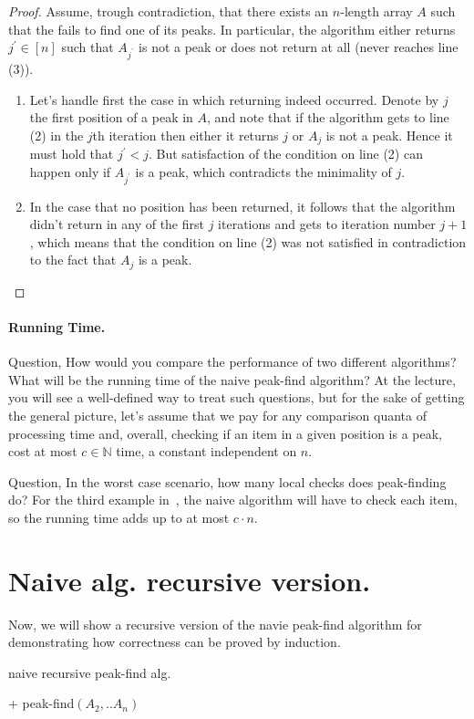 \begin{proof}
  Assume, trough contradiction, that there exists an $n$-length array $A$ such that the  fails to find one of its peaks. In particular, the algorithm either returns $j^{\prime} \in [n]$ such that $A_{j^{\prime}}$ is not a peak or does not return at all (never reaches line (3)).
\begin{enumerate}
  \item Let's handle first the case in which returning indeed occurred. Denote by $j$ the first position of a peak in $A$, and note that if the algorithm gets to line (2) in the $j$th iteration then either it returns $j$ or $A_{j}$ is not a peak.
  Hence it must hold that $j^{\prime} < j$. But satisfaction of the condition on line (2) can happen only if $A_{j^{\prime}}$ is a peak, which contradicts the minimality of $j$.
\item In the case that no position has been returned, it follows that the algorithm didn't return in any of the first $j$ iterations and gets to iteration number $j+1$, which means that the condition on line (2) was not satisfied in contradiction to the fact that $A_{j}$ is a peak.
\end{enumerate}
\end{proof}

\paragraph{Running Time.} 
Question, How would you compare the performance of two different algorithms? What will be the running time of the naive peak-find algorithm? At the lecture, you will see a well-defined way to treat such questions, but for the sake of getting the general picture, let's assume that we pay for any comparison quanta of processing time and, overall, checking if an item in a given position is a peak, cost at most $c\in \mathbb{N}$ time, a constant independent on $n$.

Question, In the worst case scenario, how many local checks does peak-finding do? For the third example in~, the naive algorithm will have to check each item, so the running time adds up to at most $c \cdot n$.

\section{Naive alg. recursive version.}
Now, we will show a recursive version of the navie peak-find algorithm for demonstrating how correctness can be proved by induction. 
\begin{algorithm}[h]
\caption{naive recursive peak-find alg.}
  + peak-find$(A_{2}, .. A_{n})$
 \end{algorithm}


